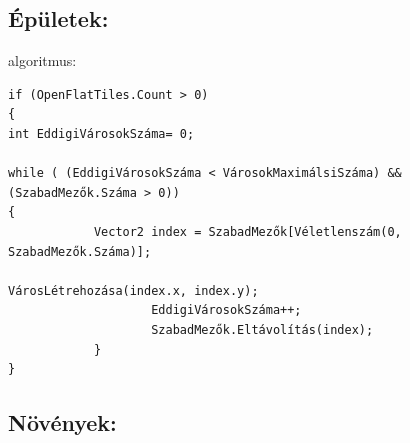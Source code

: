 \subsection{Épületek:}

algoritmus:

\begin{verbatim}
if (OpenFlatTiles.Count > 0)
{
int EddigiVárosokSzáma= 0;
    
while ( (EddigiVárosokSzáma < VárosokMaximálsiSzáma) && (SzabadMezők.Száma > 0))
{
           	Vector2 index = SzabadMezők[Véletlenszám(0, SzabadMezők.Száma)];

VárosLétrehozása(index.x, index.y);
                	EddigiVárosokSzáma++;
                	SzabadMezők.Eltávolítás(index);
            }
}
\end{verbatim}

\subsection{Növények:}

